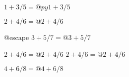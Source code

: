 


$1+3/5 = @py{1+3/5}$


$2+4/6 = @{2+4/6}$

@escape{%
$3+5/7 = @{3+5/7}$
}%

$2+4/6 = @{2+4/6}$
$2+4/6 = @{2+4/6}{}$




$4+6/8 = @{4+6/8}$



